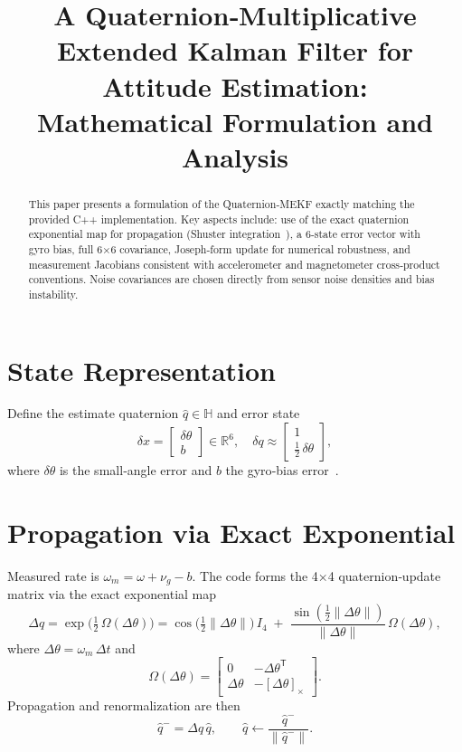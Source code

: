 \documentclass[12pt,letterpaper]{article}
\title{A Quaternion‐Multiplicative Extended Kalman Filter for Attitude Estimation:\\
Mathematical Formulation and Analysis}
\author{}
\date{}
\begin{document}
\maketitle

\begin{abstract}
This paper presents a formulation of the Quaternion‐MEKF exactly matching the provided C++ implementation.  Key aspects include: use of the exact quaternion exponential map for propagation (Shuster integration~\cite{Shuster1981}), a 6‐state error vector with gyro bias, full 6×6 covariance, Joseph‐form update for numerical robustness, and measurement Jacobians consistent with accelerometer and magnetometer cross‐product conventions.  Noise covariances are chosen directly from sensor noise densities and bias instability.
\end{abstract}

\section{State Representation}
Define the estimate quaternion $\hat q\in\mathbb H$ and error state
\[
\delta x = \begin{bmatrix}\delta\theta\\ b\end{bmatrix}\in\mathbb R^6,
\quad
\delta q \approx \begin{bmatrix}1\\ \tfrac12\,\delta\theta\end{bmatrix},
\]
where $\delta\theta$ is the small‐angle error and $b$ the gyro‐bias error~\cite{Lefferts1982,Markley2003}.

\section{Propagation via Exact Exponential}
Measured rate is $\omega_m=\omega+\nu_g - b$.  The code forms the 4×4 quaternion‐update matrix via the exact exponential map
\[
\Delta q
=\exp\!\bigl(\tfrac12\,\Omega(\Delta\theta)\bigr)
=\cos\!\bigl(\tfrac12\|\Delta\theta\|\bigr)\,I_4
\;+\;\frac{\sin(\tfrac12\|\Delta\theta\|)}{\|\Delta\theta\|}\,\Omega(\Delta\theta),
\]
where $\Delta\theta=\omega_m\,\Delta t$ and
\[
\Omega(\Delta\theta)
=\begin{bmatrix}
0 & -\Delta\theta^\mathsf{T}\\[3pt]
\Delta\theta & -[\Delta\theta]_\times
\end{bmatrix}.
\]
Propagation and renormalization are then
\[
\hat q^-=\Delta q\,\hat q,
\qquad
\hat q\leftarrow\frac{\hat q^-}{\|\hat q^-\|}.
\]
\end{document}
